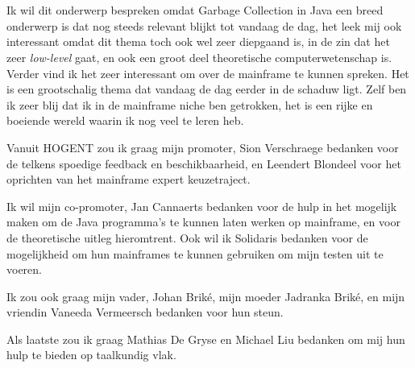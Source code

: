 
\chapter*{}%
\label{ch:voorwoord}




Ik wil dit onderwerp bespreken omdat Garbage Collection in Java een breed onderwerp is dat nog steeds relevant blijkt tot vandaag de dag, het leek mij ook interessant omdat dit thema toch ook wel zeer diepgaand is, in de zin dat het zeer \textit{low-level} gaat, en ook een groot deel theoretische computerwetenschap is.
Verder vind ik het zeer interessant om over de mainframe te kunnen spreken.
Het is een grootschalig thema dat vandaag de dag eerder in de schaduw ligt.
Zelf ben ik zeer blij dat ik in de mainframe niche ben getrokken, het is een rijke en boeiende wereld waarin ik nog veel te leren heb.



Vanuit HOGENT zou ik graag mijn promoter, Sion Verschraege bedanken voor de telkens spoedige feedback en beschikbaarheid, en Leendert Blondeel voor het oprichten van het mainframe expert keuzetraject.


Ik wil mijn co-promoter, Jan Cannaerts bedanken voor de hulp in het mogelijk maken om de Java programma's te kunnen laten werken op mainframe, en voor de theoretische uitleg hieromtrent.
Ook wil ik Solidaris bedanken voor de mogelijkheid om hun mainframes te kunnen gebruiken om mijn testen uit te voeren.


Ik zou ook graag mijn vader, Johan Briké, mijn moeder Jadranka Briké, en mijn vriendin Vaneeda Vermeersch bedanken voor hun steun.

Als laatste zou ik graag Mathias De Gryse en Michael Liu bedanken om mij hun hulp te bieden op taalkundig vlak.


